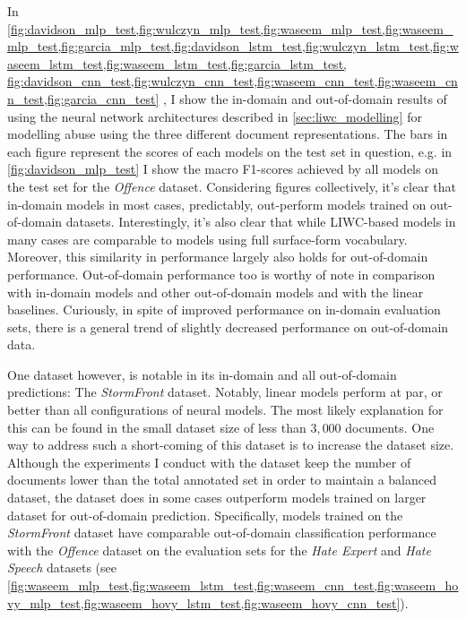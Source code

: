 In \cref{fig:davidson_mlp_test,fig:wulczyn_mlp_test,fig:waseem_mlp_test,fig:waseem_mlp_test,fig:garcia_mlp_test,fig:davidson_lstm_test,fig:wulczyn_lstm_test,fig:waseem_lstm_test,fig:waseem_lstm_test,fig:garcia_lstm_test, fig:davidson_cnn_test,fig:wulczyn_cnn_test,fig:waseem_cnn_test,fig:waseem_cnn_test,fig:garcia_cnn_test}
, I show the in-domain and out-of-domain results of using the neural network architectures described in \cref{sec:liwc_modelling} for modelling abuse using the three different document representations. The bars in each figure represent the scores of each models on the test set in question, e.g. in \cref{fig:davidson_mlp_test} I show the macro F1-scores achieved by all models on the test set for the \textit{Offence} dataset.
Considering figures collectively, it's clear that in-domain models in most cases, predictably, out-perform models trained on out-of-domain datasets. Interestingly, it's also clear that while LIWC-based models in many cases are comparable to models using full surface-form vocabulary. Moreover, this similarity in performance largely also holds for out-of-domain performance.
Out-of-domain performance too is worthy of note in comparison with in-domain models and other out-of-domain models and with the linear baselines. Curiously, in spite of improved performance on in-domain evaluation sets, there is a general trend of slightly decreased performance on out-of-domain data.

One dataset however, is notable in its in-domain and all out-of-domain predictions: The \textit{StormFront} dataset. Notably, linear models perform at par, or better than all configurations of neural models. The most likely explanation for this can be found in the small dataset size of less than $3,000$ documents. One way to address such a short-coming of this dataset is to increase the dataset size. Although the experiments I conduct with the dataset keep the number of documents lower than the total annotated set in order to maintain a balanced dataset, the dataset does in some cases outperform models trained on larger dataset for out-of-domain prediction. Specifically, models trained on the \textit{StormFront} dataset have comparable out-of-domain classification performance with the \textit{Offence} dataset on the evaluation sets for the \textit{Hate Expert} and \textit{Hate Speech} datasets (see \cref{fig:waseem_mlp_test,fig:waseem_lstm_test,fig:waseem_cnn_test,fig:waseem_hovy_mlp_test,fig:waseem_hovy_lstm_test,fig:waseem_hovy_cnn_test}).

